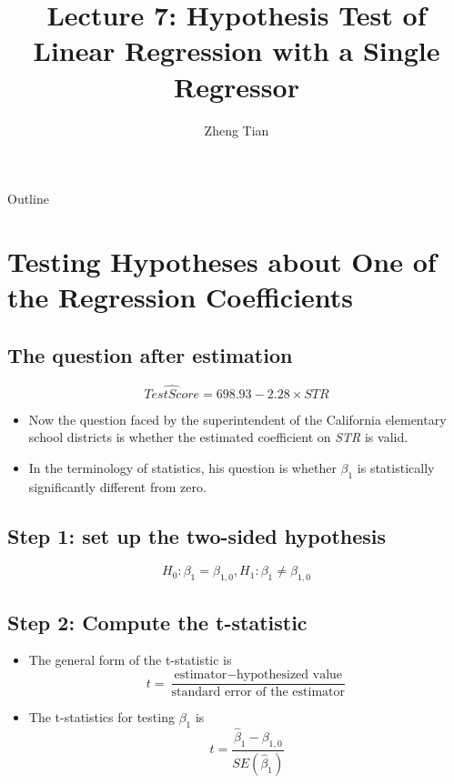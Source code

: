 \documentclass[presentation]{beamer}
\author{Zheng Tian}
\date{}
\title{Lecture 7: Hypothesis Test  of Linear Regression with a Single Regressor}
\begin{document}
\maketitle
\begin{frame}{Outline}
\setcounter{tocdepth}{1}
\tableofcontents
\end{frame}



\section*{Testing Hypotheses about One of the Regression Coefficients}
\label{sec:org2bdafa5}

\subsection*{The question after estimation}
\label{sec:org378f01e}

\begin{equation}
\label{eq:testscr-str-1e}
\widehat{TestScore} = 698.93 - 2.28 \times STR
\end{equation}

\begin{itemize}
\item Now the question faced by the superintendent of the California
elementary school districts is whether the estimated coefficient on
\emph{STR} is valid.

\item In the terminology of statistics, his question is
whether \(\beta_1\) is statistically significantly different from
zero.
\end{itemize}

\subsection*{Step 1: set up the two-sided hypothesis}
\label{sec:org0918119}

\[ H_0: \beta_1 = \beta_{1,0}, H_1: \beta_1 \neq \beta_{1,0} \]

\subsection*{Step 2: Compute the t-statistic}
\label{sec:org193edb0}

\begin{itemize}
\item The general form of the t-statistic is
\begin{equation}
\label{eq:general-t}
t = \frac{\text{estimator} - \text{hypothesized value}}{\text{standard error of the estimator}}
\end{equation}

\item The t-statistics for testing \(\beta_1\) is
\begin{equation}
\label{eq:t-stat-b1}
t = \frac{\hat{\beta}_1 - \beta_{1,0}}{SE(\hat{\beta}_1)}
\end{equation}
\end{itemize}
\end{document}
